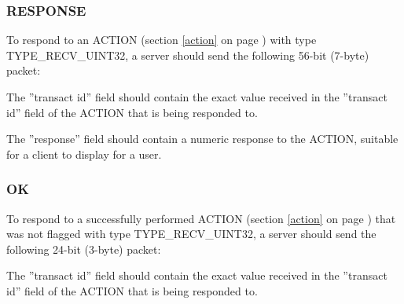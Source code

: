 \documentclass[a4paper,11pt]{article}
\begin{document}
\subsubsection{RESPONSE}
\label{server_response}
\hfill\begin{minipage}{\dimexpr\textwidth-1.4cm}
To respond to an ACTION (section \ref{action} on page \pageref{action})
with type TYPE\_RECV\_UINT32, a server should send the following
56-bit (7-byte) packet:

\vspace{0.2cm}


\vspace{0.5cm}

The ''transact id'' field should contain the exact value received in
the ''transact id'' field of the ACTION that is being responded to.

\vspace{0.3cm}

The ''response'' field should contain a numeric response to the
ACTION, suitable for a client to display for a user.
\end{minipage}

\subsubsection{OK}
\label{server_ok}
\hfill\begin{minipage}{\dimexpr\textwidth-1.4cm}
To respond to a successfully performed ACTION (section \ref{action} on page \pageref{action})
that was not flagged with type TYPE\_RECV\_UINT32, a server should send the following
24-bit (3-byte) packet:

\vspace{0.2cm}


\vspace{0.5cm}

The ''transact id'' field should contain the exact value received in
the ''transact id'' field of the ACTION that is being responded to.

\end{minipage}
\end{document}
